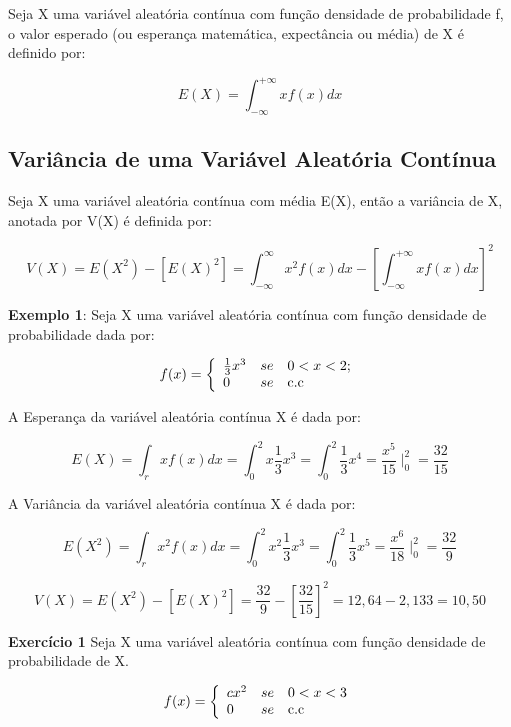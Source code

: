 Seja X uma variável aleatória contínua com função densidade de
probabilidade f, o valor esperado (ou esperança matemática,
expectância ou média) de X é definido por:


\begin{equation}\label{}
    E(X)=\int_{-\infty}^{+\infty}xf(x)dx
\end{equation}


\subsection{Variância de uma Variável Aleatória Contínua}

Seja X uma variável aleatória contínua com média E(X), então a
variância de X, anotada por V(X) é definida por:


\begin{equation}\label{}
V(X) = E(X^{2})-[E(X)^{2}]= \int_{-\infty}^{\infty}x^{2}f(x)dx
-\left[\int_{-\infty}^{+\infty}xf(x)dx\right]^{2}
\end{equation}


\textbf{Exemplo 1}: Seja X uma variável aleatória contínua com
função densidade de probabilidade dada por:

$$
f(x)=
\left\{%
\begin{array}{ll}
   \frac{1}{3}x^{3}   & se \quad \hbox{$0 < x < 2$;} \\
   0                  & se \quad \hbox{c.c} \\
\end{array}%
\right.
$$

A Esperança da variável aleatória contínua X é dada por:

$$
E(X)= \int_{r} xf(x)dx = \int^{2}_{0}x\frac{1}{3}x^{3} =
\int^{2}_{0}\frac{1}{3}x^{4} = \frac{x^{5}}{15}\mid^{2}_{0}=
\frac{32}{15}
$$

A Variância da variável aleatória contínua X é dada por:

$$
E(X^{2})= \int_{r} x^{2}f(x)dx = \int^{2}_{0}x^{2}\frac{1}{3}x^{3}
= \int^{2}_{0}\frac{1}{3}x^{5} = \frac{x^{6}}{18}\mid^{2}_{0}=
\frac{32}{9}
$$

$$
V(X) = E(X^{2})-[E(X)^{2}] =
\frac{32}{9}-\left[\frac{32}{15}\right]^{2} = 12,64 - 2,133 =
10,50
$$

\textbf{Exercício 1} Seja X uma variável aleatória contínua com
função densidade de probabilidade de X.


$$
f(x)=
\left\{%
\begin{array}{ll}
   cx^{2}      & se \quad \hbox{$0 < x < 3$} \\
   0           & se \quad \hbox{c.c} \\
\end{array}%
\right.
$$

